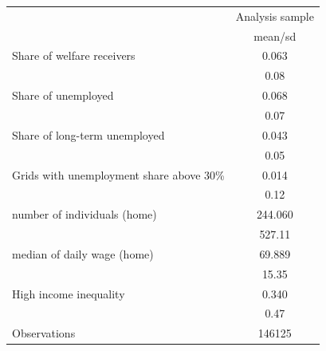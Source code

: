 {
\def\sym#1{\ifmmode^{#1}\else\(^{#1}\)\fi}
\begin{tabular}{l*{1}{c}}
\toprule
                    &\multicolumn{1}{c}{Analysis sample}\\
                    &     mean/sd\\
\midrule
Share of welfare receivers&       0.063\\
                    &        0.08\\
Share of unemployed &       0.068\\
                    &        0.07\\
Share of long-term unemployed&       0.043\\
                    &        0.05\\
Grids with unemployment share above 30\%&       0.014\\
                    &        0.12\\
number of individuals (home)&     244.060\\
                    &      527.11\\
median of daily wage (home)&      69.889\\
                    &       15.35\\
High income inequality&       0.340\\
                    &        0.47\\
\midrule
\midrule Observations&      146125\\
\bottomrule
\end{tabular}
}
